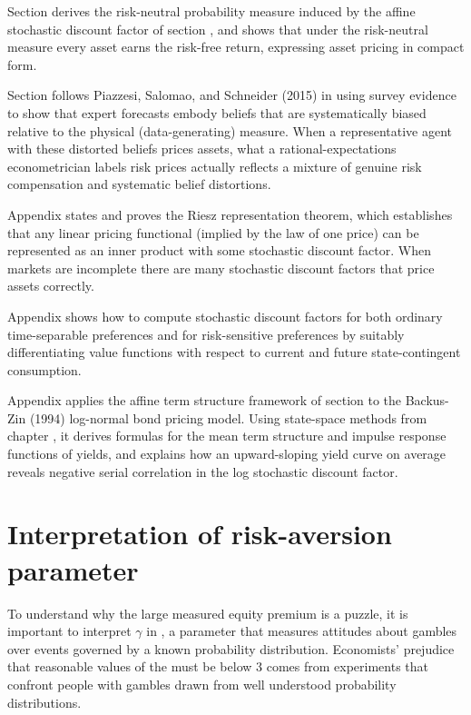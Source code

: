 Section  derives the risk-neutral probability measure induced by
the affine stochastic discount factor of section , and shows that
under the risk-neutral measure every asset earns the risk-free return, expressing
asset pricing in compact form.

Section  follows Piazzesi, Salomao, and Schneider (2015) in
using survey evidence to show that expert forecasts embody beliefs that are
systematically biased relative to the physical (data-generating) measure.  When a
representative agent with these distorted beliefs prices assets, what a
rational-expectations econometrician labels risk prices actually reflects a mixture of
genuine risk compensation and systematic belief distortions.

Appendix  states and proves the Riesz representation theorem, which
establishes that any linear pricing functional (implied by the law of one price) can be
represented as an inner product with some stochastic discount factor.  When markets are
incomplete there are many stochastic discount factors that price assets correctly.

Appendix  shows how to compute stochastic discount factors for
both ordinary time-separable preferences and for risk-sensitive preferences by
suitably differentiating value functions with respect to current and future
state-contingent consumption.

Appendix  applies the affine term structure framework of section
 to the Backus-Zin (1994) log-normal bond pricing
model.  Using state-space methods from chapter , it derives formulas
for the mean term structure and impulse response functions of yields, and explains how
an upward-sloping yield curve on average reveals negative serial correlation in the log
stochastic discount factor.

\section{Interpretation of risk-aversion parameter}\label{sec:riskparam}%
    To  understand why
the large measured equity premium is a puzzle, it is important to interpret $\gamma$ in ,
a parameter that measures attitudes about gambles over events governed by a known probability distribution.
 Economists' prejudice that reasonable values
of the  must be below 3
comes from experiments that confront people with gambles drawn from well understood probability distributions.

